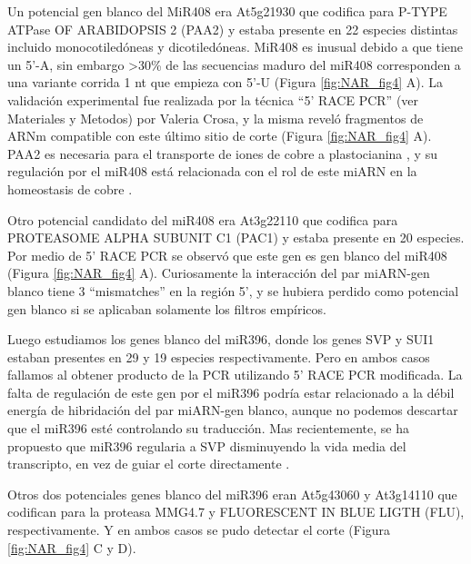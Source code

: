 Un potencial gen blanco del MiR408 era At5g21930 que codifica para P-TYPE ATPase OF ARABIDOPSIS 2 (PAA2) y estaba presente en 22 especies distintas incluido monocotiledóneas y dicotiledóneas.
MiR408 es inusual debido a que tiene un 5'-A, sin embargo >30\% de las secuencias maduro del miR408 corresponden a una variante corrida 1 nt que empieza con 5'-U \citep{Maunoury2011} (Figura \ref{fig:NAR_fig4} A).
La validación experimental fue realizada por la técnica ``5' RACE PCR'' (ver Materiales y Metodos) por Valeria Crosa, y la misma reveló fragmentos de ARNm compatible con este último sitio de corte (Figura \ref{fig:NAR_fig4} A). 
PAA2 es necesaria para el transporte de iones de cobre a plastocianina \citep{Niyogi2005}, y su regulación por el miR408 está relacionada con el rol de este miARN en la homeostasis de cobre \citep{Yamasaki2007}.

Otro potencial candidato del miR408 era At3g22110 que codifica para PROTEASOME ALPHA SUBUNIT C1 (PAC1) y estaba presente en 20 especies. Por medio de 5' RACE PCR se observó que este gen es gen blanco del miR408 (Figura \ref{fig:NAR_fig4} A). 
Curiosamente la interacción del par miARN-gen blanco tiene 3 ``mismatches'' en la región 5', y se hubiera perdido como potencial gen blanco si se aplicaban solamente los filtros empíricos.

Luego estudiamos los genes blanco del miR396, donde los genes SVP y SUI1 estaban presentes en 29 y 19 especies respectivamente.
Pero en ambos casos fallamos al obtener producto de la PCR utilizando 5' RACE PCR modificada.
La falta de regulación de este gen por el miR396 podría estar relacionado a la débil energía de hibridación del par miARN-gen blanco, aunque no podemos descartar que el miR396 esté controlando su traducción.
Mas recientemente, se ha propuesto que miR396 regularia a SVP disminuyendo la vida media  del transcripto, en vez de guiar el corte directamente \citep{pmid26103992}.

Otros dos potenciales genes blanco del miR396 eran At5g43060 y At3g14110 que codifican para la proteasa MMG4.7 y FLUORESCENT IN BLUE LIGTH (FLU), respectivamente.
Y en ambos casos se pudo detectar el corte (Figura \ref{fig:NAR_fig4} C y D).


